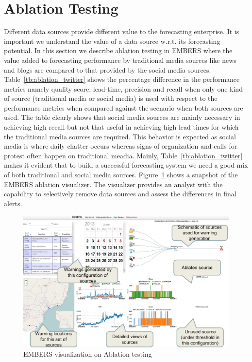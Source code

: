 \section{Ablation Testing}
\label{sec:ablation}
Different data sources provide different value to
the forecasting enterprise. It is important we understand the
value of a data source w.r.t. its forecasting potential.
In this section we describe ablation testing in EMBERS where the value added to forecasting performance by traditional media
sources like news and
blogs are compared to that provided by the social media sources.
Table~\ref{tb:ablation_twitter} shows the percentage difference in the performance metrics namely quality score, lead-time, precision and recall when only one
kind of source (traditional media or social media) is used with respect to the performance metrics when compared against the scenario when
both sources are used.
The table clearly shows that social media sources are mainly necessary in achieving high recall but not that useful in achieving high
lead times for which the traditional media sources are required. This
behavior is expected as social media is where daily chatter
occurs whereas signs of organization and calls for protest often
happen on traditional meadia.
Mainly, Table~\ref{tb:ablation_twitter} makes it evident that to build a successful forecasting system we need a good mix
of both traditional and social media sources.  Figure~\ref{fig:ablation} shows a snapshot of the EMBERS ablation visualizer. The visualizer provides an
analyst with the capability to selectively
remove data sources and assess the differences in final alerts.

\begin{figure}
\includegraphics[width=\columnwidth]{figures/cu/ablation.pdf}
\caption{EMBERS visualization on Ablation testing}
\label{fig:ablation}
\end{figure}


